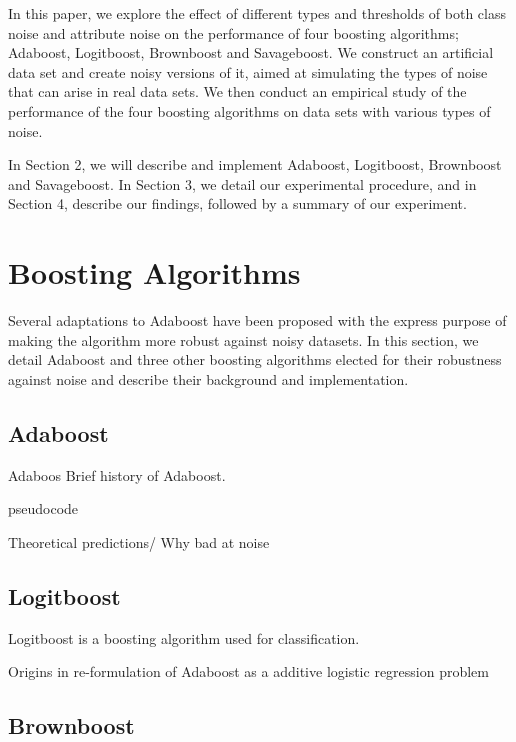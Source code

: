 \documentclass[11pt]{article}
\newcommand{\?}[0]{\vert}
\begin{document}
In this paper, we explore the effect of different types and thresholds of both class noise and attribute noise on the performance of four boosting algorithms; Adaboost, Logitboost, Brownboost and Savageboost. We construct an artificial data set and create noisy versions of it, aimed at simulating the types of noise that can arise in real data sets. We then conduct an empirical study of the performance of the four boosting algorithms on data sets with various types of noise. 

In Section 2, we will describe and implement Adaboost, Logitboost, Brownboost and Savageboost. In Section 3, we detail our experimental procedure, and in Section 4, describe our findings, followed by a summary of our experiment.  

\section{Boosting Algorithms}
Several adaptations to Adaboost have been proposed with the express purpose of making the algorithm more robust against noisy datasets. In this section, we detail Adaboost and three other boosting algorithms elected for their robustness against noise and describe their background and implementation.

\subsection{Adaboost}

Adaboos
Brief history of Adaboost.

pseudocode

Theoretical predictions/ Why bad at noise

\subsection{Logitboost}
Logitboost is a boosting algorithm used for classification. 

Origins in re-formulation of Adaboost as a additive logistic regression problem


\subsection{Brownboost}
\end{document}
